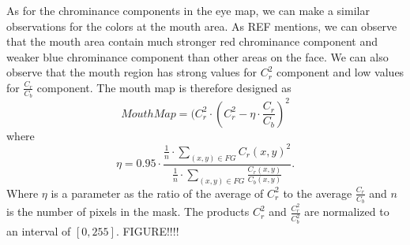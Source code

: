 As for the chrominance components in the eye map, we can make a similar observations for the colors at the mouth area. As REF mentions, we can observe that the mouth area contain much stronger red chrominance component and weaker blue chrominance component than other areas on the face. We can also observe that the mouth region has strong values for $C_r^2$ component and low values for $\frac{C_r}{C_b}$ component. The mouth map is therefore designed as
\newline
\newline
\begin{equation}
MouthMap = (C_r^2 \cdot (C_r^2 - \eta \cdot \frac{C_r}{C_b})^2
\end{equation}
\newline
where
\newline
\begin{equation}
\eta = 0.95 \cdot \frac{\frac{1}{n} \cdot \sum\limits_{(x,y) \in FG} C_r(x,y)^2}{\frac{1}{n} \cdot \sum\limits_{(x,y) \in FG} \frac{C_r(x,y)}{C_b(x,y)}}.
\end{equation}
Where $\eta$ is a parameter as the ratio of the average of $C_r^2$ to the average $\frac{C_r}{C_b}$ and $n$ is the number of pixels in the mask. The products $C_r^2$ and $\frac{C_r^2}{C_b^2}$ are normalized to an interval of $[0,255]$. FIGURE!!!!